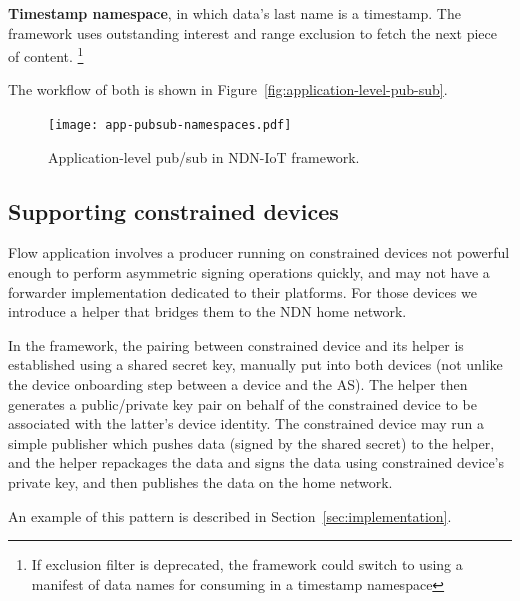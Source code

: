 \textbf{Timestamp namespace}, in which data's last name is a timestamp. The framework uses outstanding interest and range exclusion to fetch the next piece of content.
\footnote{If exclusion filter is deprecated, the framework could switch to using a manifest of data names for consuming in a timestamp namespace}

The workflow of both is shown in Figure~\ref{fig:application-level-pub-sub}.

\begin{figure}[!t]
\centering
\texttt{[image: app-pubsub-namespaces.pdf]}
\caption{Application-level pub/sub in NDN-IoT framework.}
\label{fig:flow-discovery-process}
\end{figure}

\subsection{Supporting constrained devices}

Flow application involves a producer running on constrained devices not powerful enough to perform asymmetric signing operations quickly, and may not have a forwarder implementation dedicated to their platforms. 
For those devices we introduce a helper that bridges them to the NDN home network.

In the framework, the pairing between constrained device and its helper is established using a shared secret key, manually put into both devices (not unlike the device onboarding step between a device and the AS).
The helper then generates a public/private key pair on behalf of the constrained device to be associated with the latter's device identity.
The constrained device may run a simple publisher which pushes data (signed by the shared secret) to the helper, and the helper repackages the data and signs the data using constrained device's private key, and then publishes the data on the home network.

An example of this pattern is described in Section~\ref{sec:implementation}.

